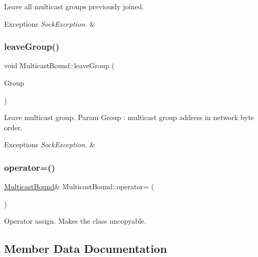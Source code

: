 Leave all multicast groups previously joined. 
\begin{DoxyExceptions}{Exceptions}
{\em Sock\+Exception.} & \\
\hline
\end{DoxyExceptions}
\mbox{\label{classMulticastBound_a85305ecf42f299160a535429563e6b94}} 
\subsubsection{\texorpdfstring{leave\+Group()}{leaveGroup()}}
{\footnotesize\ttfamily void Multicast\+Bound\+::leave\+Group (\begin{DoxyParamCaption}\item[{in\+\_\+addr\+\_\+t}]{Group }\end{DoxyParamCaption})}

Leave multicast group. Param Group \+: multicast group address in network byte order. 
\begin{DoxyExceptions}{Exceptions}
{\em Sock\+Exception.} & \\
\hline
\end{DoxyExceptions}
\mbox{\label{classMulticastBound_a8b956721a93be63018cc49fe04775207}} 
\subsubsection{\texorpdfstring{operator=()}{operator=()}}
{\footnotesize\ttfamily \hyperlink{classMulticastBound}{Multicast\+Bound}\& Multicast\+Bound\+::operator= (\begin{DoxyParamCaption}\item[{\hyperlink{classMulticastBound}{Multicast\+Bound} \&}]{ }\end{DoxyParamCaption})\hspace{0.3cm}{\ttfamily [private]}}

Operator assign. Makes the class uncopyable. 

\subsection{Member Data Documentation}
\mbox{\label{classMulticastBound_ac7596721222c7cac2c3dcc44309aebc2}} 
